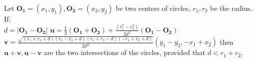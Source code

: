 Let $\mathbf{O_1} = (x_1, y_1), \mathbf{O_2} = (x_2, y_2)$ be two centers of circles,  $r_1,r_2$ be the radius. If:\\
$ d = | \mathbf{O_1} - \mathbf{O_2} | $
$ \mathbf{u} = \frac{ 1 }{ 2 } ( \mathbf{O_1} + \mathbf{O_2} )+ 
\frac{ ( r_1^2 - r_2^2 )  }
{ 2 d^2 } ( \mathbf{O_1} - \mathbf{O_2} )$ \\
$ \mathbf{v} = \frac{ \sqrt{(r_1+r_2+d) (r_1-r_2+d) (r_1+r_2-d) (-r_1+r_2+d)} }{ 2 d^2 } ( y_1 - y_2 , -x_1 + x_2 )$
then $ \mathbf{u} + \mathbf{v} , \mathbf{u} - \mathbf{v} $
are the two intersections of the circles, provided that $ d < r_1 + r_2 $.

